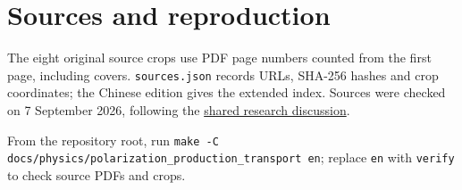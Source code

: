 \documentclass[11pt,a4paper]{article}
\begin{document}
\clearpage
\section*{Sources and reproduction}
The eight original source crops use PDF page numbers counted from the first page, including covers. \texttt{sources.json} records URLs, SHA-256 hashes and crop coordinates; the Chinese edition gives the extended index. Sources were checked on 7 September 2026, following the \href{https://chatgpt.com/share/6a9e507f-ba88-83ee-930f-861c5ef504c1}{shared research discussion}.

From the repository root, run \texttt{make -C docs/physics/polarization\_production\_transport en}; replace \texttt{en} with \texttt{verify} to check source PDFs and crops.

\begingroup\footnotesize
\linespread{1.0}\selectfont
\setlength{\bibsep}{0pt}


\endgroup
\end{document}
